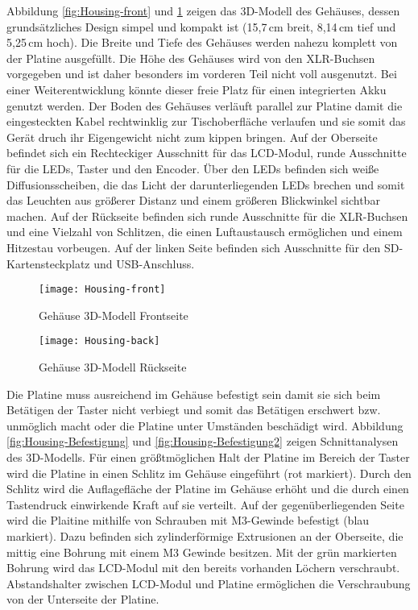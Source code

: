 Abbildung \ref{fig:Housing-front} und \ref{fig:Housing-back} zeigen das 3D-Modell des Gehäuses, dessen grundsätzliches Design simpel und kompakt ist (15,7\,cm breit, 8,14\,cm tief und 5,25\,cm hoch). Die Breite und Tiefe des Gehäuses werden nahezu komplett von der Platine ausgefüllt. Die Höhe des Gehäuses wird von den XLR-Buchsen vorgegeben und ist daher besonders im vorderen Teil nicht voll ausgenutzt. Bei einer Weiterentwicklung könnte dieser freie Platz für einen integrierten Akku genutzt werden. Der Boden des Gehäuses verläuft parallel zur Platine damit die eingesteckten Kabel rechtwinklig zur Tischoberfläche verlaufen und sie somit das Gerät druch ihr Eigengewicht nicht zum kippen bringen. Auf der Oberseite befindet sich ein Rechteckiger Ausschnitt für das LCD-Modul, runde Ausschnitte für die LEDs, Taster und den Encoder. Über den LEDs befinden sich weiße Diffusionsscheiben, die das Licht der darunterliegenden LEDs brechen und somit das Leuchten aus größerer Distanz und einem größeren Blickwinkel sichtbar machen. Auf der Rückseite befinden sich runde Ausschnitte für die XLR-Buchsen und eine Vielzahl von Schlitzen, die einen Luftaustausch ermöglichen und einem Hitzestau vorbeugen. Auf der linken Seite befinden sich Ausschnitte für den SD-Kartensteckplatz und USB-Anschluss.
\begin{figure}[h]
	\begin{minipage}{.45\linewidth}
		\centering
		\texttt{[image: Housing-front]}
		\caption{Gehäuse 3D-Modell Frontseite}
		\label{fig:Housing-front}
	\end{minipage}
	\hfill
	\begin{minipage}{.45\linewidth}
		\centering
		\texttt{[image: Housing-back]}
		\caption{Gehäuse 3D-Modell Rückseite}
		\label{fig:Housing-back}
	\end{minipage}
\end{figure}
Die Platine muss ausreichend im Gehäuse befestigt sein damit sie sich beim Betätigen der Taster nicht verbiegt und somit das Betätigen erschwert bzw. unmöglich macht oder die Platine unter Umständen beschädigt wird. Abbildung \ref{fig:Housing-Befestigung} und \ref{fig:Housing-Befestigung2} zeigen Schnittanalysen des 3D-Modells. Für einen größtmöglichen Halt der Platine im Bereich der Taster wird die Platine in einen Schlitz im Gehäuse eingeführt (rot markiert). Durch den Schlitz wird die Auflagefläche der Platine im Gehäuse erhöht und die durch einen Tastendruck einwirkende Kraft auf sie verteilt. Auf der gegenüberliegenden Seite wird die Plaitine mithilfe von Schrauben mit M3-Gewinde befestigt (blau markiert). Dazu befinden sich zylinderförmige Extrusionen an der Oberseite, die mittig eine Bohrung mit einem M3 Gewinde besitzen. Mit der grün markierten Bohrung wird das LCD-Modul mit den bereits vorhanden Löchern verschraubt. Abstandshalter zwischen LCD-Modul und Platine ermöglichen die Verschraubung von der Unterseite der Platine.
